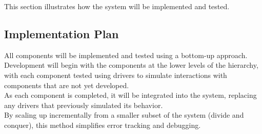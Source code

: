 This section illustrates how the system will be implemented and tested.

\subsection{Implementation Plan}

All components will be implemented and tested using a bottom-up approach. Development will begin with the components at the lower levels of the hierarchy, with each component tested using drivers to simulate interactions with components that are not yet developed.\\
\noindent
As each component is completed, it will be integrated into the system, replacing any drivers that previously simulated its behavior.\\
\noindent
By scaling up incrementally from a smaller subset of the system (divide and conquer), this method simplifies error tracking and debugging.

